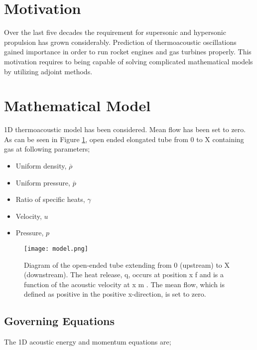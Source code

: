 {}
\section{Motivation}
 
  Over the last five decades the requirement for supersonic and hypersonic propulsion has grown considerably. Prediction of thermoacoustic oscillations gained importance in order to run rocket engines and gas turbines properly. This motivation requires to being capable of solving complicated mathematical models by utilizing adjoint methods.
  
  \section{Mathematical Model}
  
  1D thermoacoustic model has been considered. Mean flow has been set to zero. As can be seen in Figure \ref{fig:model}, open ended elongated tube from 0 to X containing gas at following parameters;
  \begin{itemize}
	\item{Uniform density, $\overline{\rho}$}
	\item{Uniform pressure, $\overline{p}$}
	\item{Ratio of specific heats, $\gamma$}
	\item{Velocity, $u$}
	\item{Pressure, $p$}  
\end{itemize}  
\begin{figure}[!htb]
	
	\texttt{[image: model.png]}
	\caption{Diagram of the open-ended tube extending from 0 (upstream) to X (downstream). The heat
		release, q, occurs at position x f and is a function of the acoustic velocity at x m . The mean flow,
		which is defined as positive in the positive x-direction, is set to zero.}
	\label{fig:model}
	
\end{figure}

  





\subsection{Governing Equations}

The 1D acoustic energy and momentum equations are;

